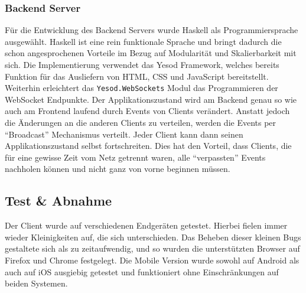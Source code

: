 \subsubsection{Backend Server}
Für die Entwicklung des Backend Servers wurde Haskell als
Programmiersprache ausgewählt. Haskell ist eine rein funktionale
Sprache und bringt dadurch die schon angesprochenen Vorteile im Bezug
auf Modularität und Skalierbarkeit mit sich. Die Implementierung
verwendet das \gls{Yesod Framework}, welches bereits Funktion für das
Ausliefern von HTML, CSS und JavaScript bereitstellt. Weiterhin erleichtert
das \texttt{Yesod.WebSockets} Modul das Programmieren der WebSocket
Endpunkte. Der Applikationszustand wird am Backend genau so wie auch
am Frontend laufend durch Events von Clients verändert. Anstatt jedoch
die Änderungen an die anderen Clients zu verteilen, werden die Events
per ``Broadcast'' Mechanismus verteilt. Jeder Client kann dann seinen
Applikationszustand selbst fortschreiten. Dies hat den Vorteil, dass
Clients, die für eine gewisse Zeit vom Netz getrennt waren, alle
``verpassten'' Events nachholen können und nicht ganz von vorne
beginnen müssen.
\subsection{Test \& Abnahme}
Der Client wurde auf verschiedenen Endgeräten getestet. Hierbei fielen
immer wieder Kleinigkeiten auf, die sich unterschieden. Das Beheben
dieser kleinen Bugs gestaltete sich als zu zeitaufwendig, und so wurden
die unterstützten Browser auf Firefox und Chrome festgelegt.
Die Mobile Version wurde sowohl auf Android als auch auf iOS ausgiebig
getestet und funktioniert ohne Einschränkungen auf beiden Systemen.
